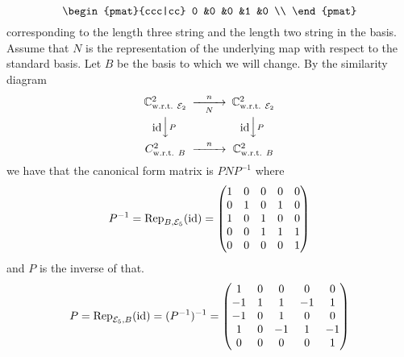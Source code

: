 \begin{exercises}
\begin{answer}
\begin{exparts}
\begin{equation*}
\begin{pmat}{ccc|cc}
              0  &0  &0  &1  &0  \\
            \end{pmat}
          \end{equation*}
          corresponding to the length three string and the length two
          string in the basis.
        \partsitem Assume that $N$ is the representation of the underlying
          map with respect to the standard basis.
          Let $B$ be the basis to which we will change. 
          By the similarity diagram
          \begin{equation*}
            \begin{CD}
              \C^2_\wrt{\stdbasis_2}      
                  @>n>N>        
                  \C^2_\wrt{\stdbasis_2}     \\
             @V\scriptstyle\identity V\scriptstyle PV  
                 @V\scriptstyle\identity V\scriptstyle PV \\
             C^2_\wrt{B}                 
                 @>n>>         
             \C^2_\wrt{B}
           \end{CD}
         \end{equation*}
         we have that the canonical form matrix is $PNP^{-1}$ where 
         \begin{equation*}
           P^{-1}
           ={\rm Rep}_{B,{\cal E}_5}(\mbox{id})
           =\begin{pmatrix}
              1 &0 &0 &0 &0 \\              
              0 &1 &0 &1 &0 \\
              1 &0 &1 &0 &0 \\
              0 &0 &1 &1 &1 \\
              0 &0 &0 &0 &1
            \end{pmatrix}
         \end{equation*}
         and $P$ is the inverse of that.
         \begin{equation*}
           P={\rm Rep}_{{\cal E}_5,B}(\mbox{id})
            =(P^{-1})^{-1}
           =\begin{pmatrix}
              1 &0 &0 &0 &0 \\              
             -1 &1 &1 &-1&1 \\
             -1 &0 &1 &0 &0 \\
              1 &0 &-1&1 &-1\\
              0 &0 &0 &0 &1
            \end{pmatrix}
         \end{equation*}

\end{exparts}
\end{answer}
\end{exercises}
